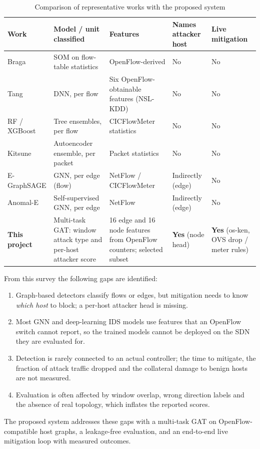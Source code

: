 \begin{table}[htbp]
\centering
\caption{Comparison of representative works with the proposed system}
\label{tab:litcompare}
\small
\begin{tabularx}{\textwidth}{|p{2.4cm}|X|X|X|X|}
\hline
\textbf{Work} & \textbf{Model / unit classified} & \textbf{Features} & \textbf{Names attacker host} & \textbf{Live mitigation} \\ \hline
Braga \cite{bib:braga} & SOM on flow-table statistics & OpenFlow-derived & No & No \\ \hline
Tang \cite{bib:tang} & DNN, per flow & Six OpenFlow-obtainable features (NSL-KDD) & No & No \\ \hline
RF / XGBoost \cite{bib:rf,bib:xgb} & Tree ensembles, per flow & CICFlowMeter statistics & No & No \\ \hline
Kitsune \cite{bib:kitsune} & Autoencoder ensemble, per packet & Packet statistics & No & No \\ \hline
E-GraphSAGE \cite{bib:egraphsage} & GNN, per edge (flow) & NetFlow / CICFlowMeter & Indirectly (edge) & No \\ \hline
Anomal-E \cite{bib:anomale} & Self-supervised GNN, per edge & NetFlow & Indirectly (edge) & No \\ \hline
\textbf{This project} & Multi-task GAT: window attack type and per-host attacker score & 16 edge and 16 node features from OpenFlow counters; selected subset & \textbf{Yes} (node head) & \textbf{Yes} (os-ken, OVS drop / meter rules) \\ \hline
\end{tabularx}
\end{table}

From this survey the following gaps are identified:
\begin{enumerate}
	\item Graph-based detectors classify flows or edges, but mitigation needs to know \emph{which host} to block; a per-host attacker head is missing.
	\item Most GNN and deep-learning IDS models use features that an OpenFlow switch cannot report, so the trained models cannot be deployed on the SDN they are evaluated for.
	\item Detection is rarely connected to an actual controller; the time to mitigate, the fraction of attack traffic dropped and the collateral damage to benign hosts are not measured.
	\item Evaluation is often affected by window overlap, wrong direction labels and the absence of real topology, which inflates the reported scores.
\end{enumerate}
The proposed system addresses these gaps with a multi-task GAT on OpenFlow-compatible host graphs, a leakage-free evaluation, and an end-to-end live mitigation loop with measured outcomes.
